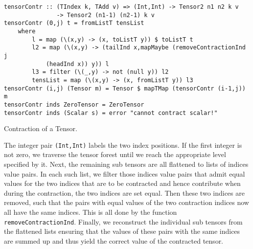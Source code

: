 \begin{listing}[hbt!] 
\begin{verbatim}
tensorContr :: (TIndex k, TAdd v) => (Int,Int) -> Tensor2 n1 n2 k v
               -> Tensor2 (n1-1) (n2-1) k v
tensorContr (0,j) t = fromListT tensList
    where
        l = map (\(x,y) -> (x, toListT y)) $ toListT t
        l2 = map (\(x,y) -> (tailInd x,mapMaybe (removeContractionInd j
            (headInd x)) y)) l
        l3 = filter (\(_,y) -> not (null y)) l2
        tensList = map (\(x,y) -> (x, fromListT y)) l3
tensorContr (i,j) (Tensor m) = Tensor $ mapTMap (tensorContr (i-1,j)) m
tensorContr inds ZeroTensor = ZeroTensor
tensorContr inds (Scalar s) = error "cannot contract scalar!"
\end{verbatim} 
\caption{Contraction of a Tensor.}\label{TensorContr}
\end{listing}

The integer pair \texttt{(Int,Int)} labels the two index positions. If the first integer is not zero, we traverse the tensor forest until we reach the appropriate level specified by it. Next, the remaining sub tensors are all flattened to lists of indices value pairs. In each such list, we filter those indices value pairs that admit equal values for the two indices that are to be contracted and hence contribute when during the contraction, the two indices are set equal. Then these two indices are removed, such that the pairs with equal values of the two contraction indices now all have the same indices. This is all done by the function \texttt{removeContractionInd}. Finally, we reconstruct the individual sub tensors from the flattened lists ensuring that the values of these pairs with the same indices are summed up and thus yield the correct value of the contracted tensor. 

